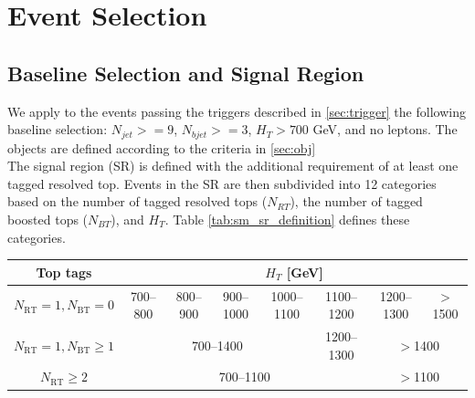\documentclass[twoside]{article}
\begin{document}
\label{fig:tageff_sf_pass}


\section{Event Selection}
\subsection{Baseline Selection and Signal Region}
We apply to the events passing the triggers described in \autoref{sec:trigger} the following baseline selection: $N_{jet}>=9$, $N_{bjet}>=3$, $H_T>700$ GeV, and no leptons. The objects are defined according to the criteria in \autoref{sec:obj}
\\

The signal region (SR) is defined with the additional requirement of at least one tagged resolved top. Events in the SR are then subdivided into 12 categories based on the number of tagged resolved tops ($N_{RT}$), the number of tagged boosted tops ($N_{BT}$), and $H_T$. Table \ref{tab:sm_sr_definition} defines these categories.

\begin{table}[ht]
\centering
\begin{tabular}{|c|*{7}{c|}}
\hline
\textbf{Top tags} & \multicolumn{7}{c|}{$H_T$ [GeV]} \\
\hline
$N_\text{RT} = 1, N_\text{BT} = 0$ & 700--800 & 800--900 & 900--1000 & 1000--1100 & 1100--1200 & 1200--1300 & $>$1500 \\
\hline
$N_\text{RT} = 1, N_\text{BT} \geq 1$ & \multicolumn{4}{c|}{700--1400} & 1200--1300 & \multicolumn{2}{c|}{$>$1400} \\
\hline
$N_\text{RT} \geq 2$ & \multicolumn{5}{c|}{700--1100} & \multicolumn{2}{c|}{$>$1100} \\
\hline
\end{tabular}
\end{table}
\label{tab:sm_sr_definition}
\end{document}

